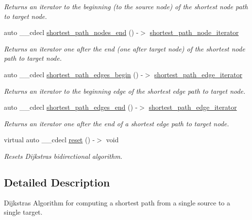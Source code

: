 \begin{DoxyCompactItemize}
\begin{DoxyCompactList}\small\item\em Returns an iterator to the beginning (to the source node) of the shortest node path to target node. \end{DoxyCompactList}\item 
auto \+\_\+\+\_\+cdecl \mbox{\hyperlink{classbid__dijkstra_a673043c7caa291e499c055635b31ddff}{shortest\+\_\+path\+\_\+nodes\+\_\+end}} () -\/$>$ \mbox{\hyperlink{classbid__dijkstra_ada2e642d9f0582d30fe1dd51c4aa1899}{shortest\+\_\+path\+\_\+node\+\_\+iterator}}
\begin{DoxyCompactList}\small\item\em Returns an iterator one after the end (one after target node) of the shortest node path to target node. \end{DoxyCompactList}\item 
auto \+\_\+\+\_\+cdecl \mbox{\hyperlink{classbid__dijkstra_a526e88fb20c84fda11d5d4205e6da578}{shortest\+\_\+path\+\_\+edges\+\_\+begin}} () -\/$>$ \mbox{\hyperlink{classbid__dijkstra_a703d0faf9568bc25a9305faa61412fe1}{shortest\+\_\+path\+\_\+edge\+\_\+iterator}}
\begin{DoxyCompactList}\small\item\em Returns an iterator to the beginning edge of the shortest edge path to target node. \end{DoxyCompactList}\item 
auto \+\_\+\+\_\+cdecl \mbox{\hyperlink{classbid__dijkstra_a1bafedb79a967012255d93262a6a18e1}{shortest\+\_\+path\+\_\+edges\+\_\+end}} () -\/$>$ \mbox{\hyperlink{classbid__dijkstra_a703d0faf9568bc25a9305faa61412fe1}{shortest\+\_\+path\+\_\+edge\+\_\+iterator}}
\begin{DoxyCompactList}\small\item\em Returns an iterator one after the end of a shortest edge path to target node. \end{DoxyCompactList}\item 
virtual auto \+\_\+\+\_\+cdecl \mbox{\hyperlink{classbid__dijkstra_ac7fa26bc76c1d3d0e0074fb01c66f72e}{reset}} () -\/$>$ void
\begin{DoxyCompactList}\small\item\em Resets Dijkstra\textquotesingle{}s bidirectional algorithm. \end{DoxyCompactList}\end{DoxyCompactItemize}


\subsection{Detailed Description}
Dijkstra\textquotesingle{}s Algorithm for computing a shortest path from a single source to a single target. 

